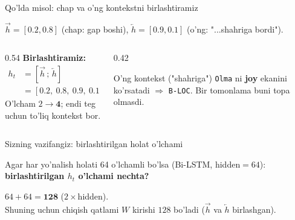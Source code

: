 \documentclass[aspectratio=169,11pt]{beamer}
\begin{document}
\begin{frame}{Qo'lda misol: chap va o'ng kontekstni birlashtiramiz}
  \begin{tcolorbox}[defbox,title={Token "Olma" uchun ikki tomonlama holat (o'lcham 2)}]
    \small $\overrightarrow{h}=[0.2, 0.8]$ (chap: gap boshi),\;
    $\overleftarrow{h}=[0.9, 0.1]$ (o'ng: "...shahriga bordi").
  \end{tcolorbox}
  \vspace{0.2em}
  \begin{columns}[T]
    \begin{column}{0.54\textwidth}
      \textbf{Birlashtiramiz:}
      \begin{align*}
        h_t &= [\overrightarrow{h} \,;\, \overleftarrow{h}]\\
            &= [0.2,\ 0.8,\ 0.9,\ 0.1]
      \end{align*}
      O'lcham $2 \to \mathbf{4}$; endi teg uchun to'liq kontekst bor.
    \end{column}
    \begin{column}{0.42\textwidth}
      \begin{tcolorbox}[okbox,top=2pt,bottom=2pt]
        \footnotesize
        O'ng kontekst ("shahriga") \texttt{Olma} ni \textbf{joy} ekanini ko'rsatadi
        $\Rightarrow$ \texttt{B-LOC}. Bir tomonlama buni topa olmasdi.
      \end{tcolorbox}
    \end{column}
  \end{columns}
\end{frame}

\begin{frame}{Sizning vazifangiz: birlashtirilgan holat o'lchami}
  \begin{tcolorbox}[warnbox,title=Savol --- 60 soniya]
    \small
    Agar har yo'nalish holati 64 o'lchamli bo'lsa (Bi-LSTM, hidden$=64$):\\[4pt]
    \textbf{\large birlashtirilgan $h_t$ o'lchami nechta? }
  \end{tcolorbox}
  \pause
  \begin{tcolorbox}[okbox,title=Javob]
    \small
    $64 + 64 = \mathbf{128}$ ($2\times$hidden).\\[3pt]
    \footnotesize Shuning uchun chiqish qatlami $W$ kirishi $128$ bo'ladi
    ($\overrightarrow{h}$ va $\overleftarrow{h}$ birlashgan).
  \end{tcolorbox}
\end{frame}
\end{document}
